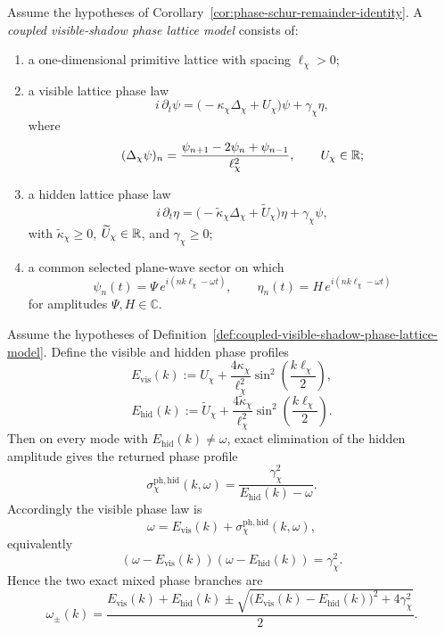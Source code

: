 \begin{definition}
\label{def:coupled-visible-shadow-phase-lattice-model}
Assume the hypotheses of
Corollary~\ref{cor:phase-schur-remainder-identity}. A
\emph{coupled visible-shadow phase lattice model} consists of:
\begin{enumerate}[label=(\roman*),itemsep=0.2em]
\item a one-dimensional primitive lattice with spacing \(\ell_{\chi}>0\);
\item a visible lattice phase law
      \[
      i\,\partial_t\psi
      =
      \bigl(-\kappa_{\chi}\Delta_{\chi}+U_{\chi}\bigr)\psi
      +
      \gamma_{\chi}\eta,
      \]
      where
      \[
      (\Delta_{\chi}\psi)_n
      =
      \frac{\psi_{n+1}-2\psi_n+\psi_{n-1}}{\ell_{\chi}^2},
      \qquad
      U_{\chi}\in\mathbb{R};
      \]
\item a hidden lattice phase law
      \[
      i\,\partial_t\eta
      =
      \bigl(-\widetilde\kappa_{\chi}\Delta_{\chi}+\widetilde U_{\chi}\bigr)\eta
      +
      \gamma_{\chi}\psi,
      \]
      with \(\widetilde\kappa_{\chi}\ge 0\),
      \(\widetilde U_{\chi}\in\mathbb{R}\), and \(\gamma_{\chi}\ge 0\);
\item a common selected plane-wave sector on which
      \[
      \psi_n(t)=\Psi\,e^{i(nk\ell_{\chi}-\omega t)},
      \qquad
      \eta_n(t)=H\,e^{i(nk\ell_{\chi}-\omega t)}
      \]
      for amplitudes \(\Psi,H\in\mathbb C\).
\end{enumerate}
\end{definition}

\begin{theorem}
\label{thm:hidden-channel-phase-remainder-and-spectral-splitting}
Assume the hypotheses of
Definition~\ref{def:coupled-visible-shadow-phase-lattice-model}. Define the
visible and hidden phase profiles
\[
E_{\mathrm{vis}}(k)
:=
U_{\chi}
+
\frac{4\kappa_{\chi}}{\ell_{\chi}^2}
\sin^2\!\left(\frac{k\ell_{\chi}}{2}\right),
\]
\[
E_{\mathrm{hid}}(k)
:=
\widetilde U_{\chi}
+
\frac{4\widetilde\kappa_{\chi}}{\ell_{\chi}^2}
\sin^2\!\left(\frac{k\ell_{\chi}}{2}\right).
\]
Then on every mode with \(E_{\mathrm{hid}}(k)\neq \omega\), exact elimination
of the hidden amplitude gives the returned phase profile
\[
\sigma_{\chi}^{\mathrm{ph,hid}}(k,\omega)
=
\frac{\gamma_{\chi}^2}{E_{\mathrm{hid}}(k)-\omega}.
\]
Accordingly the visible phase law is
\[
\omega
=
E_{\mathrm{vis}}(k)
+
\sigma_{\chi}^{\mathrm{ph,hid}}(k,\omega),
\]
equivalently
\[
(\omega-E_{\mathrm{vis}}(k))
(\omega-E_{\mathrm{hid}}(k))
=
\gamma_{\chi}^2.
\]
Hence the two exact mixed phase branches are
\[
\omega_{\pm}(k)
=
\frac{
E_{\mathrm{vis}}(k)+E_{\mathrm{hid}}(k)
\pm
\sqrt{
\bigl(E_{\mathrm{vis}}(k)-E_{\mathrm{hid}}(k)\bigr)^2
+
4\gamma_{\chi}^2
}
}{2}.
\]
\end{theorem}

